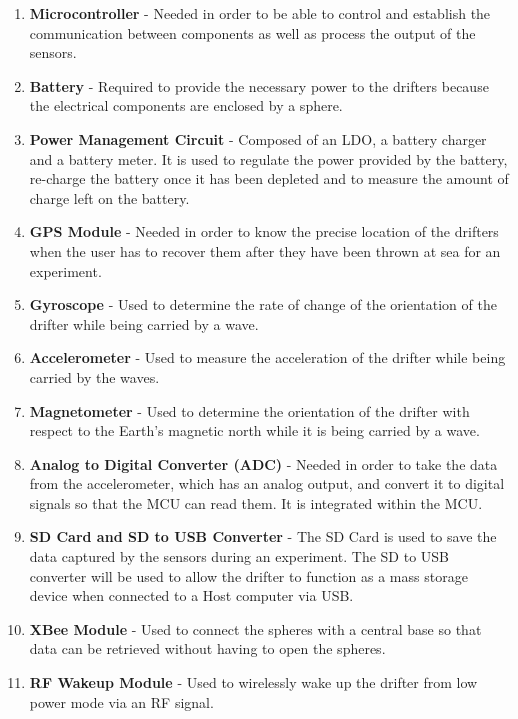 \begin{enumerate}
\item \textbf{Microcontroller} -  Needed in order to be able to control and establish the communication between components as well as process the output of the sensors.

\item \textbf{Battery} - Required to provide the necessary power to the drifters because the electrical components are enclosed by a sphere.

\item \textbf{Power Management Circuit} - Composed of an LDO, a battery charger and a battery meter.  It is used to regulate the power provided by the battery, re-charge the battery once it has been depleted and to measure the amount of charge left on the battery.

\item \textbf{GPS Module} - Needed in order to know the precise location of the drifters when the user has to recover them after they have been thrown at sea for an experiment.

\item \textbf{Gyroscope} - Used to determine the rate of change of the orientation of the drifter while being carried by a wave.

\item \textbf{Accelerometer} - Used to measure the acceleration of the drifter while being carried by the waves.

\item \textbf{Magnetometer} - Used to determine the orientation of the drifter with respect to the Earth's magnetic north while it is being carried by a wave.

\item \textbf{Analog to Digital Converter (ADC)} - Needed in order to take the data from the accelerometer, which has an analog output, and convert it to digital signals so that the MCU can read them.  It is integrated within the MCU.

\item \textbf{SD Card and SD to USB Converter} - The SD Card is used to save the data captured by the sensors during an experiment.  The SD to USB converter will be used to allow the drifter to function as a mass storage device when connected to a Host computer via USB.

\item \textbf{XBee Module} - Used to connect the spheres with a central base so that data can be retrieved without having to open the spheres.


\item \textbf{RF Wakeup Module} - Used to wirelessly wake up the drifter from low power mode via an RF signal.

\end{enumerate}

